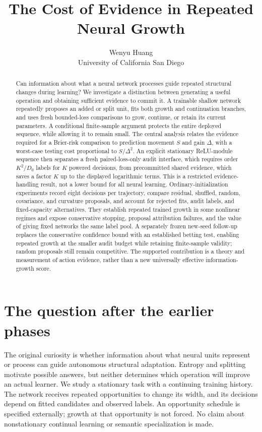 \documentclass[11pt]{article}
\title{The Cost of Evidence in Repeated Neural Growth}
\author{Wenyu Huang\\University of California San Diego}\date{}
\theoremstyle{remark}\newtheorem{remark}[theorem]{Remark}
\begin{document}
\maketitle
\begin{abstract}
Can information about what a neural network processes guide repeated
structural changes during learning? We investigate a distinction between
generating a useful operation and obtaining sufficient evidence to commit
it. A trainable shallow network repeatedly proposes an added or split unit,
fits both growth and continuation branches, and uses fresh bounded-loss
comparisons to grow, continue, or retain its current parameters. A conditional
finite-sample argument protects the entire deployed sequence, while allowing
it to remain small. The central analysis relates the evidence required for a
Brier-risk comparison to prediction movement $S$ and gain $\Delta$, with a
worst-case testing cost proportional to $S/\Delta^2$. An explicit stationary
ReLU-module sequence then separates a fresh paired-loss-only audit interface,
which requires order $K^2/D_0$ labels for $K$ powered decisions, from
precommitted shared evidence, which saves a factor $K$ up to the displayed
logarithmic terms. This is a restricted evidence-handling result, not a lower
bound for all neural learning. Ordinary-initialization experiments record
eight decisions per trajectory, compare residual, shuffled, random,
covariance, and curvature proposals, and account for rejected fits, audit
labels, and fixed-capacity alternatives. They establish repeated trained
growth in some nonlinear regimes and expose conservative stopping, proposal
attribution failures, and the value of giving fixed networks the same label
pool. A separately frozen new-seed follow-up replaces the conservative
confidence bound with an established betting test, enabling repeated growth
at the smaller audit budget while retaining finite-sample validity; random
proposals still remain competitive. The supported contribution is a theory and measurement of action
evidence, rather than a new universally effective information-growth score.
\end{abstract}
\tableofcontents

\section{The question after the earlier phases}
The original curiosity is whether information about what neural units
represent or process can guide autonomous structural adaptation. Entropy and
splitting motivate possible answers, but neither determines which operation
will improve an actual learner. We study a stationary task with a continuing
training history. The network receives repeated opportunities to change its
width, and its decisions depend on fitted candidates and observed labels.
An opportunity schedule is specified externally; growth at that opportunity
is not forced. No claim about nonstationary continual learning or semantic
specialization is made.
\end{document}
